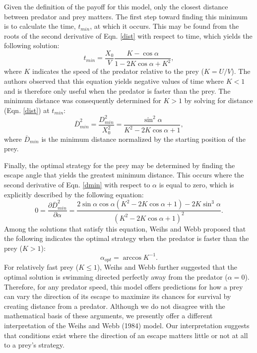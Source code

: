 \documentclass[12pt]{article}
\def\d{\partial}
\newcommand{\ol}{\overline}
\begin{document}
Given the definition of the payoff for this model, only the closest distance between predator and prey matters. The first step toward finding this minimum is to calculate the time, $t_{min}$,  at which it occurs. This may be found from the roots of the second derivative of Eqn. \ref{dist} with respect to time, which yields the following solution:
%
\begin{equation}
t_{min} = \frac{X_0}{V} \frac{K-\cos\alpha}{1-2 K\cos\alpha+K^2},
\label{eq33weihs}	
\end{equation}
%
where $K$ indicates the speed of the predator relative to the prey ($K = U/V$). The authors observed that this equation yields negative values of time where $K<1$ and is therefore only useful when the predator is faster than the prey. The minimum distance was consequently determined for $K>1$ by solving for distance (Eqn. \ref{dist}) at $t_{min}$:
%
\begin{equation}
\ol D_{min}^2 = \frac{D_{min}^2}{X_0^2} = \frac{\sin^2\alpha}{K^2 - 2K \cos\alpha + 1},
\label{dmin}
\end{equation}
where $\ol D_{min}$ is the minimum distance normalized by the starting position of the prey.

Finally, the optimal strategy for the prey may be determined by finding the escape angle that yields the greatest minimum distance. This occurs where the second derivative of Eqn. \ref{dmin} with respect to $\alpha$ is equal to zero, which is explicitly described by the following equation:
%
\begin{equation}
0 = \frac{\d \ol{D}^2_{min}}{\d \alpha} = \frac{2\sin\alpha \cos\alpha (K^2 -2 K \cos\alpha+1)-2 K \sin^3\alpha}{(K^2-2 K \cos\alpha + 1)^2}. 
\label{eq37weihs}
\end{equation}
%
Among the solutions that satisfy this equation, Weihs and Webb proposed that the following indicates the optimal strategy when the predator is faster than the prey ($K>1$):
%
\begin{equation}
\alpha_{opt} = \arccos K^{-1}. 
\label{K>1}
\end{equation}
%
For relatively fast prey ($K\leq1$), Weihs and Webb further suggested that the optimal solution is swimming directed perfectly away from the predator ($\alpha = 0$). Therefore, for any predator speed, this model offers predictions for how a prey can vary the direction of its escape to maximize its chances for survival by creating distance from a predator. Although we do not disagree with the mathematical basis of these arguments, we presently offer a different interpretation of the Weihs and Webb (1984) model. Our interpretation suggests that conditions exist where the direction of an escape matters little or not at all to a prey's strategy.
\end{document}
